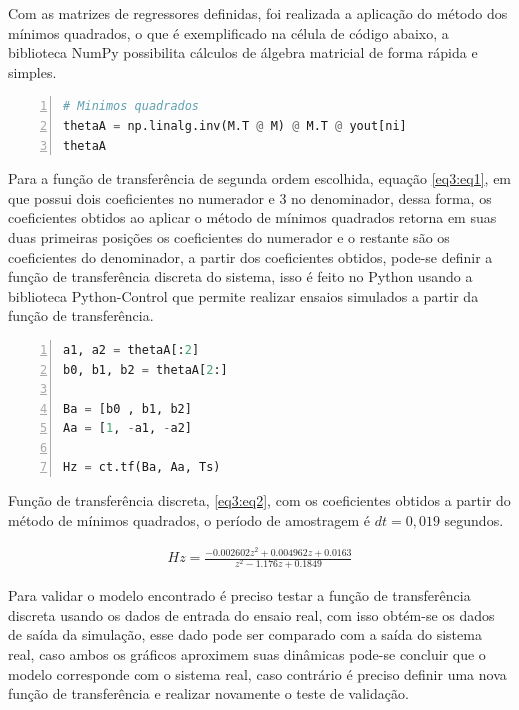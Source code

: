 Com as matrizes de regressores definidas, foi realizada a aplicação do método dos mínimos quadrados, o que é exemplificado na célula de código abaixo, a biblioteca NumPy possibilita cálculos de álgebra matricial de forma rápida e simples.

\vspace{0.5cm}

\begin{lstlisting}[language=python, numbers=left, label=py3, caption={Método dos mínimos quadrados.}]
# Minimos quadrados
thetaA = np.linalg.inv(M.T @ M) @ M.T @ yout[ni]
thetaA
\end{lstlisting}

Para a função de transferência de segunda ordem escolhida, equação \ref{eq3:eq1}, em que possui dois coeficientes no numerador e 3 no denominador, dessa forma, os coeficientes obtidos ao aplicar o método de mínimos quadrados retorna em suas duas primeiras posições os coeficientes do numerador e o restante são os coeficientes do denominador, a partir dos coeficientes obtidos, pode-se definir a função de transferência discreta do sistema, isso é feito no Python usando a biblioteca Python-Control que permite realizar ensaios simulados a partir da função de transferência.

\vspace{0.5cm}

\begin{lstlisting}[language=python, numbers=left, label=py3, caption={Salvando os coeficientes em variáveis e obtendo a função de transferência.}]
a1, a2 = thetaA[:2]
b0, b1, b2 = thetaA[2:]

Ba = [b0 , b1, b2]
Aa = [1, -a1, -a2]

Hz = ct.tf(Ba, Aa, Ts)
\end{lstlisting}

Função de transferência discreta, \ref{eq3:eq2}, com os coeficientes obtidos a partir do método de mínimos quadrados, o período de amostragem é $dt = 0,019$  segundos.

\begin{align}
Hz = \frac{-0.002602 z^2 + 0.004962 z + 0.0163}{z^2 - 1.176 z + 0.1849} \label{eq3:eq2}
\end{align}


Para validar o modelo encontrado é preciso testar a função de transferência discreta usando os dados de entrada do ensaio real, com isso obtém-se os dados de saída da simulação, esse dado pode ser comparado com a saída do sistema real, caso ambos os gráficos aproximem suas dinâmicas pode-se concluir que o modelo corresponde com o sistema real, caso contrário é preciso definir uma nova função de transferência e realizar novamente o teste de validação.

